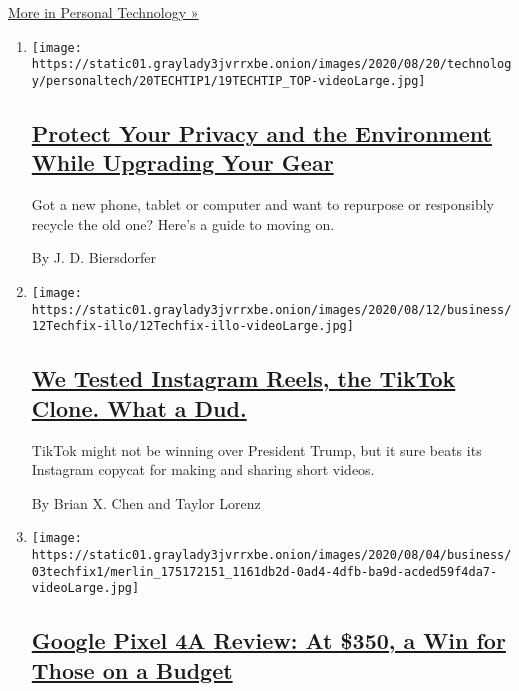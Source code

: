 \href{/section/technology/personaltech}{More in Personal Technology »}

\begin{enumerate}
\def\labelenumi{\arabic{enumi}.}
\item
  \texttt{[image: https://static01.graylady3jvrrxbe.onion/images/2020/08/20/technology/personaltech/20TECHTIP1/19TECHTIP\_TOP-videoLarge.jpg]}

  \hypertarget{protect-your-privacy-and-the-environment-while-upgrading-your-gear}{%
  \subsection{\texorpdfstring{\href{/2020/08/19/technology/personaltech/smartphone-iphone-computer-recycle.html}{Protect
  Your Privacy and the Environment While Upgrading Your
  Gear}}{Protect Your Privacy and the Environment While Upgrading Your Gear}}\label{protect-your-privacy-and-the-environment-while-upgrading-your-gear}}

  Got a new phone, tablet or computer and want to repurpose or
  responsibly recycle the old one? Here's a guide to moving on.

  By J. D. Biersdorfer
\item
  \texttt{[image: https://static01.graylady3jvrrxbe.onion/images/2020/08/12/business/12Techfix-illo/12Techfix-illo-videoLarge.jpg]}

  \hypertarget{we-tested-instagram-reels-the-tiktok-clone-what-a-dud}{%
  \subsection{\texorpdfstring{\href{/2020/08/12/technology/personaltech/tested-facebook-reels-tiktok-clone-dud.html}{We
  Tested Instagram Reels, the TikTok Clone. What a
  Dud.}}{We Tested Instagram Reels, the TikTok Clone. What a Dud.}}\label{we-tested-instagram-reels-the-tiktok-clone-what-a-dud}}

  TikTok might not be winning over President Trump, but it sure beats
  its Instagram copycat for making and sharing short videos.

  By Brian X. Chen and Taylor Lorenz
\item
  \texttt{[image: https://static01.graylady3jvrrxbe.onion/images/2020/08/04/business/03techfix1/merlin\_175172151\_1161db2d-0ad4-4dfb-ba9d-acded59f4da7-videoLarge.jpg]}

  \hypertarget{google-pixel-4a-review-at-350-a-win-for-those-on-a-budget}{%
  \subsection{\texorpdfstring{\href{/2020/08/03/technology/personaltech/google-pixel-4a-review.html}{Google
  Pixel 4A Review: At \$350, a Win for Those on a
  Budget}}{Google Pixel 4A Review: At \$350, a Win for Those on a Budget}}\label{google-pixel-4a-review-at-350-a-win-for-those-on-a-budget}}


\end{enumerate}
